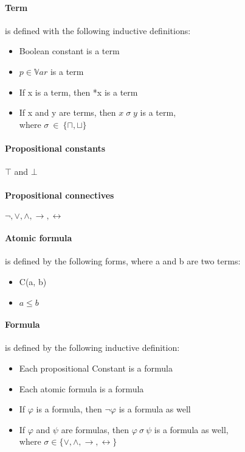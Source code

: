\documentclass{article}
\begin{document}
	\paragraph{Term} 
is defined with the following inductive definitions:
	\label{sec:term-inductive-definition}
		\begin{itemize}
			\item Boolean constant is a term
			\item $p \in \mathbb{V}ar$ is a term
			\item If x is a term, then *x is a term
			\item If x and y are terms, then $x \; \sigma \; y $ is a term,\\
				where $\sigma \: \in \: \{\sqcap, \sqcup\}$
		\end{itemize}	

	\paragraph{Propositional constants}
$\top$ and $\bot$ 

	\paragraph{Propositional connectives} 
$\neg, \vee, \wedge, \rightarrow, \leftrightarrow$

	\paragraph{Atomic formula}
is defined by the following forms, where a and b are two terms:
		\begin{itemize}
			\item C(a, b)
			\item $a \le b$
		\end{itemize}

	\paragraph{Formula}
is defined by the following inductive definition:
	\label{sec:formula-inductive-definition}
		\begin{itemize}
			\item Each propositional Constant is a formula
			\item Each atomic formula is a formula 
			\item If $\varphi$ is a formula, then $\neg{\varphi}$ is a formula as well
			\item If $\varphi$ and $\psi$ are formulas, then $\varphi \: \sigma \: \psi $ is a formula as well,\\
				where $\sigma \in \{\vee, \wedge, \rightarrow, \leftrightarrow\}$
		\end{itemize}
\end{document}
